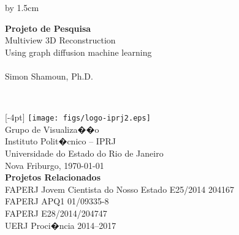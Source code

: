 \begin{titlepage}
\begin{changemargin}{-0.5cm}{-1cm}
\renewcommand{\title}{%
  {\LARGE Multiview 3D Reconstruction}\\
  {\LARGE Using graph diffusion machine learning}\\[4pt]
}
\renewcommand{\author}{Simon Shamoun, Ph.D.}
\renewcommand{\date}{\today}
\newcommand{\info}{%
  \raisebox{4pt}[-4pt]{%
  \texttt{[image: figs/logo-iprj2.eps]} 
  \hspace{0.1in}
  }\\

  Grupo de Visualiza��o\\
  Instituto Polit�cnico -- IPRJ\\
  Universidade do Estado do Rio de Janeiro\\[1.5cm]

  Nova Friburgo, \date\\[1.5cm]

  \textbf{Projetos Relacionados}\\[4pt]
   FAPERJ Jovem Cientista do Nosso Estado E25/2014 204167\\
   FAPERJ APQ1 01/09335-8\\
   FAPERJ E28/2014/204747\\
   UERJ Proci�ncia 2014--2017
}

\newlength{\topToTitle} 
\setlength{\topToTitle}{30pt}

\newlength{\leftToTitle} 
\setlength{\leftToTitle}{-50pt}

\newlength{\titleToInfo} 
\setlength{\titleToInfo}{7cm}

\newlength{\myTextWidth}
\setlength{\myTextWidth}{\textwidth}
\advance\myTextWidth by 1.5cm


\thispagestyle{empty}
\vspace*{\topToTitle}
\begin{minipage}{\myTextWidth}
  \sffamily
  \hspace*{\leftToTitle}\begin{minipage}{60cm}
    \Large\textbf{Projeto de Pesquisa}\\[1.5cm]
    \title\\[1.5cm]
    \author
  \end{minipage}\\

  \vspace*{\titleToInfo}

  \begin{minipage}{\textwidth}
    \flushright
    \info
  \end{minipage}
\end{minipage}%
\end{changemargin}
\end{titlepage}
